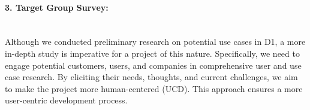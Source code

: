 \documentclass[11pt]{article}
\begin{document}
\paragraph{3. Target Group Survey:}\mbox{} \\ 
Although we conducted preliminary research on potential use cases in D1, a more in-depth study is imperative for a project of this nature. Specifically, we need to engage potential customers, users, and companies in comprehensive user and use case research. By eliciting their needs, thoughts, and current challenges, we aim to make the project more human-centered (UCD). This approach ensures a more user-centric development process.

\printbibliography

\end{document}
